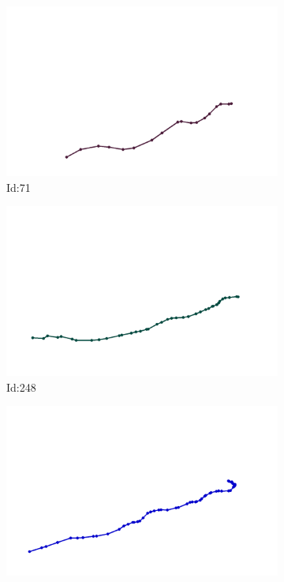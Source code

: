 \documentclass[12pt,twoside]{report}
\begin{document}
\begin{figure}
\centering
\begin{subfigure}[b]{0.20\textwidth}
\centering
\includegraphics[width=\textwidth]{../../trajectories/71.png}
\caption{Id:71}
\end{subfigure}
\begin{subfigure}[b]{0.20\textwidth}
\centering
\includegraphics[width=\textwidth]{../../trajectories/248.png}
\caption{Id:248}
\end{subfigure}
\begin{subfigure}[b]{0.20\textwidth}
\centering
\includegraphics[width=\textwidth]{../../trajectories/249.png}

\end{subfigure}
\end{figure}
\end{document}
